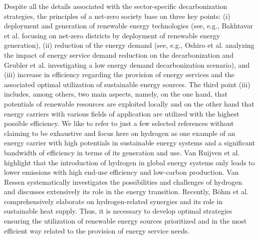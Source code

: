 Despite all the details associated with the sector-specific decarbonization strategies, the principles of a net-zero society base on three key points: (i) deployment and generation of renewable energy technologies (see, e.g., Bakhtavar et al. \cite{bakhtavar2020assessment} focusing on net-zero districts by deployment of renewable energy generation), (ii) reduction of the energy demand (see, e.g., Oshiro et al. \cite{oshiro2021enabling} analyzing the impact of energy service demand reduction on the decarbonization and Grubler et al. \cite{grubler2018low} investigating a low energy demand decarbonization scenario), and (iii) increase in efficiency regarding the provision of energy services and the associated optimal utilization of sustainable energy sources. The third point (iii) includes, among others, two main aspects, namely, on the one hand, that potentials of renewable resources are exploited locally and on the other hand that energy carriers with various fields of application are utilized with the highest possible efficiency. We like to refer to just a few selected references without claiming to be exhaustive and focus here on hydrogen as one example of an energy carrier with high potentials in sustainable energy systems and a significant bandwidth of efficiency in terms of its generation and use. Van Ruijven et al. \cite{van2007potential} highlight that the introduction of hydrogen in global energy systems only leads to lower emissions with high end-use efficiency and low-carbon production. Van Ressen \cite{van2020hydrogen} systematically investigates the possibilities and challenges of hydrogen and discusses extensively its role in the energy transition. Recently, Böhm et al. \cite{bohm2021power} comprehensively elaborate on hydrogen-related synergies and its role in sustainable heat supply. Thus, it is necessary to develop optimal strategies ensuring the utilization of renewable energy sources prioritized and in the most efficient way related to the provision of energy service needs.\newline 

